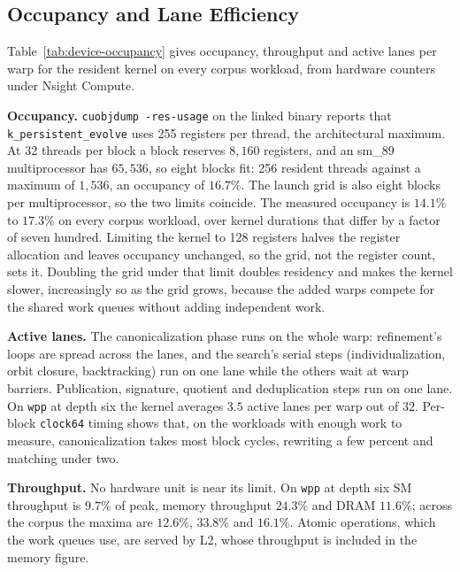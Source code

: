 \begin{table}[htbp]
\centering
\caption{Wall time and peak SM-busy against blocks per streaming multiprocessor.}
\label{tab:t11-saturation}

\end{table}

\subsection{Occupancy and Lane Efficiency}
\label{sec:device-bounds}

Table~\ref{tab:device-occupancy} gives occupancy, throughput and active lanes per warp for the
resident kernel on every corpus workload, from hardware counters under Nsight Compute.

\textbf{Occupancy.} \texttt{cuobjdump -res-usage} on the linked binary reports that
\texttt{k\_persistent\_evolve} uses 255 registers per thread, the architectural maximum. At 32
threads per block a block reserves $8{,}160$ registers, and an sm\_89 multiprocessor has
$65{,}536$, so eight blocks fit: 256 resident threads against a maximum of $1{,}536$, an occupancy
of $16.7\%$. The launch grid is also eight blocks per multiprocessor, so the two limits coincide.
The measured occupancy is $14.1\%$ to $17.3\%$ on every corpus workload, over kernel durations that
differ by a factor of seven hundred. Limiting the kernel to 128 registers halves the register
allocation and leaves occupancy unchanged, so the grid, not the register count, sets it. Doubling
the grid under that limit doubles residency and makes the kernel slower, increasingly so as the grid
grows, because the added warps compete for the shared work queues without adding independent work.

\textbf{Active lanes.} The canonicalization phase runs on the whole warp: refinement's loops are
spread across the lanes, and the search's serial steps (individualization, orbit closure, backtracking)
run on one lane while the others wait at warp barriers. Publication, signature, quotient and
deduplication steps run on one lane. On \texttt{wpp} at depth six the kernel averages $3.5$ active
lanes per warp out of $32$. Per-block \texttt{clock64} timing shows that, on the workloads with
enough work to measure, canonicalization takes most block cycles, rewriting a few percent and
matching under two.

\textbf{Throughput.} No hardware unit is near its limit. On \texttt{wpp} at depth six SM
throughput is $9.7\%$ of peak, memory throughput $24.3\%$ and DRAM $11.6\%$; across the corpus the
maxima are $12.6\%$, $33.8\%$ and $16.1\%$. Atomic operations, which the work queues use, are
served by L2, whose throughput is included in the memory figure.

